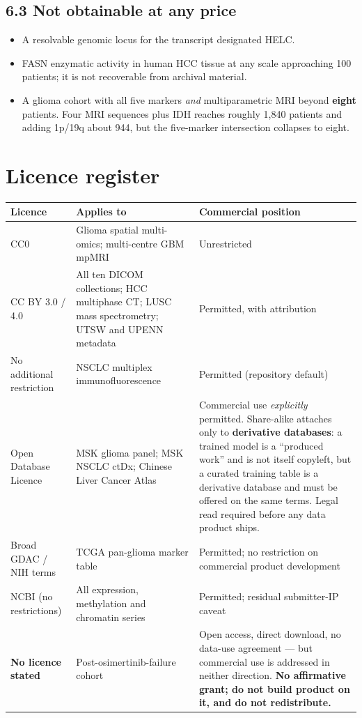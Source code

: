 \documentclass[11pt,a4paper]{article}
\begin{document}
\subsection*{6.3 Not obtainable at any price}
\begin{itemize}[leftmargin=1.4em,nosep]
\item A resolvable genomic locus for the transcript designated HELC.
\item FASN enzymatic activity in human HCC tissue at any scale approaching 100 patients;
it is not recoverable from archival material.
\item A glioma cohort with all five markers \emph{and} multiparametric MRI beyond
\textbf{eight} patients. Four MRI sequences plus IDH reaches roughly 1{,}840 patients and
adding 1p/19q about 944, but the five-marker intersection collapses to eight.
\end{itemize}

\section{Licence register}

\begin{center}
\small
\begin{tabular}{@{}p{3.6cm}p{4.4cm}p{6.4cm}@{}}
\toprule
\textbf{Licence} & \textbf{Applies to} & \textbf{Commercial position} \\
\midrule
CC0 & Glioma spatial multi-omics; multi-centre GBM mpMRI & Unrestricted \\
CC BY 3.0 / 4.0 & All ten DICOM collections; HCC multiphase CT; LUSC mass spectrometry;
UTSW and UPENN metadata & Permitted, with attribution \\
No additional restriction & NSCLC multiplex immunofluorescence & Permitted (repository
default) \\
Open Database Licence & MSK glioma panel; MSK NSCLC ctDx; Chinese Liver Cancer Atlas &
Commercial use \emph{explicitly} permitted. Share-alike attaches only to
\textbf{derivative databases}: a trained model is a ``produced work'' and is not itself
copyleft, but a curated training table is a derivative database and must be offered on
the same terms. Legal read required before any data product ships. \\
Broad GDAC / NIH terms & TCGA pan-glioma marker table & Permitted; no restriction on
commercial product development \\
NCBI (no restrictions) & All expression, methylation and chromatin series & Permitted;
residual submitter-IP caveat \\
\textbf{No licence stated} & Post-osimertinib-failure cohort & Open access, direct
download, no data-use agreement --- but commercial use is addressed in neither direction.
\textbf{No affirmative grant; do not build product on it, and do not redistribute.} \\
\bottomrule
\end{tabular}
\end{center}
\end{document}
